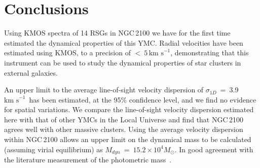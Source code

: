 \documentclass[useAMS,usenatbib]{mn2e}
\def\kms{$\mbox{km s}^{-1}$}
\begin{document}






\section{Conclusions} %
\label{sec:conclusions}

Using KMOS spectra of 14 RSGs in NGC\,2100 we have for the first time estimated the dynamical properties of this YMC.
Radial velocities have been estimated using KMOS, to a precision of $<~5$\,\kms, demonstrating that this instrument can be used to study the dynamical properties of star clusters in external galaxies.

An upper limit to the average line-of-sight velocity dispersion of $\sigma_{1D}$~=~3.9\,\kms~has been estimated, at the 95\% confidence level, and we find no evidence for spatial variations.
We compare the line-of-sight velocity dispersion estimated here with that of other YMCs in the Local Universe and find that NGC\,2100 agrees well with other massive clusters.
Using the average velocity dispersion within NGC\,2100 allows an upper limit on the dynamical mass to be calculated
(assuming virial equilibrium) as $M_{dyn}$~=~$15.2\times 10^{4}M_{\odot}$.
In good agreement with the literature measurement of the photometric mass~\citep{2005ApJS..161..304M}.
\end{document}
